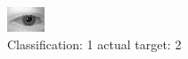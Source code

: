 \begin{figure}[h!]
\begin{center}
\includegraphics[width=0.60\columnwidth]{figures/ID388_class_1_target_2.png}
\end{center}
\caption{ Classification: 1 actual target: 2}
\label{fig:ID388_class_1_target_2}
\end{figure}
